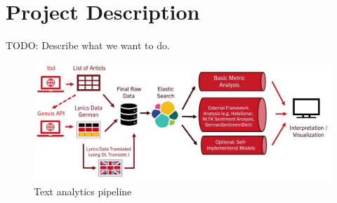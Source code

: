 \section{Project Description}\label{sec:project}

TODO: Describe what we want to do.

\begin{figure}[!htb]
    \centering
    \includegraphics[width=\textwidth]{figures/pipeline.jpg}
    \caption[]{Text analytics pipeline}
    \label{fig:pipeline}
  \end{figure}
  